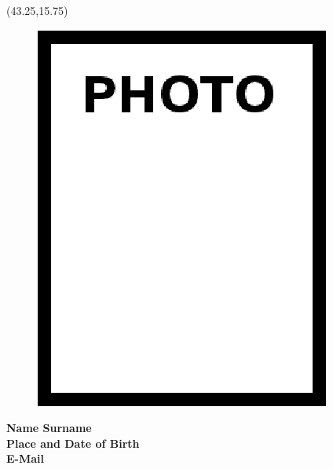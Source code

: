 \vspace*{10mm}
\setlength{\TPHorizModule}{10pt}
\setlength{\TPVertModule}{10pt}
\begin{textblock}{1}(43.25,15.75) %
	\begin{figure}[p]
		\includegraphics[scale=0.35,keepaspectratio=true]{./fig/photo}
	\end{figure}	
\end{textblock}
\vspace*{30mm}
\textbf{Name Surname\makebox[2.155cm]{\hfill \textbf{:}}}\hspace{0.225em} \\ %

\vspace{-3mm}
\textbf{Place and Date of Birth\makebox[0.735cm]{\hfill \textbf{:}}}\hspace{0.225em} \\ %

\vspace{-3mm}
\textbf{E-Mail\makebox[3.685cm]{\hfill \textbf{:}}}\hspace{0.225em} \\ %

\vspace{5mm}


